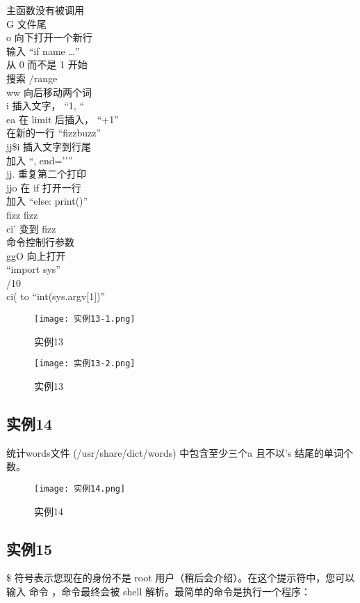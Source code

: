 \documentclass[a4paper, 12pt]{article}
\begin{document}
主函数没有被调用\\
G 文件尾\\
o 向下打开一个新行\\
输入 “if name …”\\
从 0 而不是 1 开始\\
搜索 /range\\
ww 向后移动两个词\\
i 插入文字， “1, “\\
ea 在 limit 后插入， “+1”\\
在新的一行 “fizzbuzz”\\
jj\$i 插入文字到行尾\\
加入 “, end=’’”\\
jj. 重复第二个打印\\
jjo 在 if 打开一行\\
加入 “else: print()”\\
fizz fizz\\
ci' 变到 fizz\\
命令控制行参数\\
ggO 向上打开\\
“import sys”\\
/10\\
ci( to “int(sys.argv[1])”\\

\begin{figure}[h!]
  \centering
  \texttt{[image: 实例13-1.png]}
  \caption{实例13}
\end{figure}

\begin{figure}[h!]
  \centering
  \texttt{[image: 实例13-2.png]}
  \caption{实例13}
\end{figure}

\subsection{实例14}
统计words文件 (/usr/share/dict/words) 中包含至少三个a 且不以's 结尾的单词个数。

\begin{figure}[h!]
  \centering
  \texttt{[image: 实例14.png]}
  \caption{实例14}
\end{figure}

\subsection{实例15}
\$ 符号表示您现在的身份不是 root 用户（稍后会介绍）。在这个提示符中，您可以输入 命令 ，命令最终会被 shell 解析。最简单的命令是执行一个程序：
\end{document}
